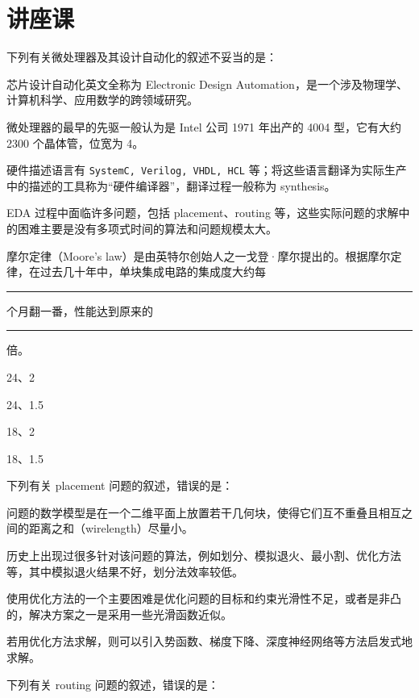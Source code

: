 \chapter{讲座课}\thispagestyle{empty}
    \begin{problems}
        \pro 下列有关微处理器及其设计自动化的叙述不妥当的是：
        \begin{choices}
            \item 芯片设计自动化英文全称为 Electronic Design Automation，是一个涉及物理学、计算机科学、应用数学的跨领域研究。
            \item 微处理器的最早的先驱一般认为是 Intel 公司 1971 年出产的 4004 型，它有大约 2300 个晶体管，位宽为 4。
            \item 硬件描述语言有 \verb|SystemC, Verilog, VHDL, HCL| 等；将这些语言翻译为实际生产中的描述的工具称为“硬件编译器”，翻译过程一般称为 synthesis。
            \item EDA 过程中面临许多问题，包括 placement、routing 等，这些实际问题的求解中的困难主要是没有多项式时间的算法和问题规模太大。
        \end{choices}
        \pro 摩尔定律（Moore's law）是由英特尔创始人之一戈登·摩尔提出的。根据摩尔定律，在过去几十年中，单块集成电路的集成度大约每 \rule{1cm}{0.25mm} 个月翻一番，性能达到原来的 \rule{1cm}{0.25mm} 倍。
        \begin{choices}
            \item 24、2
            \item 24、1.5
            \item 18、2
            \item 18、1.5
        \end{choices}
        \pro 下列有关 placement 问题的叙述，错误的是：
        \begin{choices}
            \item 问题的数学模型是在一个二维平面上放置若干几何块，使得它们互不重叠且相互之间的距离之和（wirelength）尽量小。
            \item 历史上出现过很多针对该问题的算法，例如划分、模拟退火、最小割、优化方法等，其中模拟退火结果不好，划分法效率较低。
            \item 使用优化方法的一个主要困难是优化问题的目标和约束光滑性不足，或者是非凸的，解决方案之一是采用一些光滑函数近似。
            \item 若用优化方法求解，则可以引入势函数、梯度下降、深度神经网络等方法启发式地求解。
        \end{choices}
        \pro 下列有关 routing 问题的叙述，错误的是：

\end{problems}
